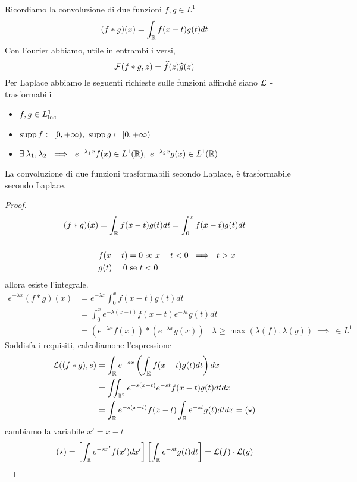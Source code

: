 Ricordiamo la convoluzione di due funzioni $f, g\in L^{1}$
\begin{equation*}
(f*g)(x) = \int_{\mathbb{R}} f(x - t) g(t) dt
\end{equation*}
Con Fourier abbiamo, utile in entrambi i versi,
\begin{equation*}
\mathcal{F}(f*g, z) = \widehat{f}(z)\widehat{g}(z)
\end{equation*}
Per Laplace abbiamo le seguenti richieste sulle funzioni affinché siano $\mathcal{L}$ - trasformabili
\begin{itemize}
\item $f, g\in L^{1}_{\operatorname{loc}}$
\item $\operatorname*{supp} f\subset [0, + \infty), \ \operatorname*{supp} g\subset [0, + \infty)$
\item $\exists \lambda_{1}, \lambda_{2} \ \implies \ e^{- \lambda_{1} x} f(x) \in L^{1}(\RR), \ e^{- \lambda_{2} x} g(x) \in L^{1}(\RR)$
\end{itemize}
\begin{thm}
La convoluzione di due funzioni trasformabili secondo Laplace, è trasformabile secondo Laplace.
\end{thm}
\begin{proof}
\begin{equation*}
\begin{aligned}
(f*g)(x) & = \int_{\mathbb{R}} f(x - t) g(t) dt = \int^{x}_{0} f(x - t) g(t) dt\\
 & \\
 & f(x - t) = 0\ \text{se} \ x - t < 0\ \implies \ t > x\\
 & g(t) = 0\ \text{se} \ t < 0
\end{aligned}
\end{equation*}
allora esiste l'integrale.
\begin{equation*}
\begin{aligned}
e^{- \lambda x}(f*g)(x) & = e^{- \lambda x}\int^{x}_{0} f(x - t) g(t) dt\\
 & = \int^{x}_{0} e^{- \lambda (x - t)} f(x - t) e^{- \lambda t} g(t) dt\\
 & = \left(e^{- \lambda x} f(x)\right) *\left(e^{- \lambda x} g(x)\right) \ \ \ \ \lambda \geq \max(\lambda (f), \lambda (g)) \ \implies \ \in L^{1}
\end{aligned}
\end{equation*}
Soddisfa i requisiti, calcoliamone l'espressione
\begin{align*}
\mathcal{L}((f*g), s) & = \int_{\mathbb{R}} e^{- sx}\left(\int_{\mathbb{R}} f(x - t) g(t) dt\right) dx\\
 & = \iint_{\mathbb{R}^{2}} e^{- s(x - t)} e^{- st} f(x - t) g(t) dtdx\\
 & = \int_{\mathbb{R}} e^{- s(x - t)} f(x - t)\int_{\mathbb{R}} e^{- st} g(t) dtdx = (\star)
\end{align*}
cambiamo la variabile $x' = x - t$
\begin{gather*}
(\star) = \left[\int_{\mathbb{R}} e^{- sx'} f(x') dx'\right]\left[\int_{\mathbb{R}} e^{- st} g(t) dt\right] = \mathcal{L}(f) \cdot \mathcal{L}(g)
\end{gather*}
\end{proof}


